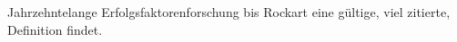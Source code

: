 Jahrzehntelange Erfolgsfaktorenforschung bis Rockart eine gültige, viel zitierte, Definition findet.